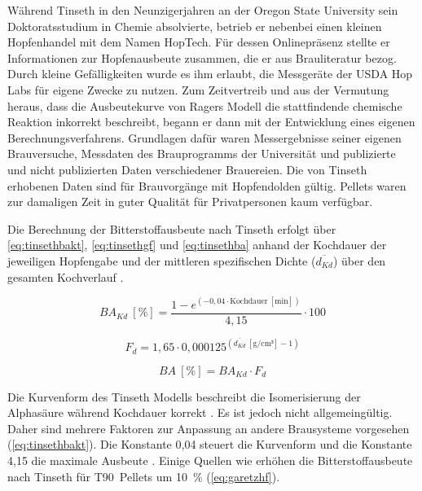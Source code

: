 \documentclass[a4paper,parskip=half]{scrartcl}
\newcommand{\BA}{\mathit{BA}}
\newcommand{\BAKt}{{\mathit{BA}}_{\mathit{Kd}}}
\newcommand{\umin}{\:[\textrm{min}]}
\newcommand{\uden}{\:[\text{g/cm³}]}
\newcommand{\uper}{\:[\text{\%}]}
\newcommand{\FKd}{F_{\mathit{d}}}
\newcommand{\dKt}{\overline{d_{\mathit{Kd}}}}
\begin{document}
Während Tinseth in den Neunzigerjahren an der Oregon State University sein Doktoratsstudium in Chemie absolvierte, betrieb er nebenbei einen kleinen Hopfenhandel mit dem Namen HopTech. Für dessen Onlinepräsenz stellte er Informationen zur Hopfenausbeute zusammen, die er aus Brauliteratur bezog. Durch kleine Gefälligkeiten wurde es ihm erlaubt, die Messgeräte der USDA Hop Labs für eigene Zwecke zu nutzen. Zum Zeitvertreib und aus der Vermutung heraus, dass die Ausbeutekurve von Ragers Modell die stattfindende chemische Reaktion inkorrekt beschreibt, begann er dann mit der Entwicklung eines eigenen Berechnungsverfahrens. Grundlagen dafür waren Messergebnisse seiner eigenen Brauversuche, Messdaten des Brauprogramms der Universität und publizierte und nicht publizierten Daten verschiedener Brauereien. Die von Tinseth erhobenen Daten sind für Brauvorgänge mit Hopfendolden gültig. Pellets waren zur damaligen Zeit in guter Qualität für Privatpersonen kaum verfügbar. \parencites[0:55:45-1:08:00]{Beechum2017a}[2:10-6:30]{Smith2011}

Die Berechnung der Bitterstoffausbeute nach Tinseth erfolgt über \autoref{eq:tinsethbakt}, \autoref{eq:tinsethgf} und \autoref{eq:tinsethba} anhand der Kochdauer der jeweiligen Hopfengabe und der mittleren spezifischen Dichte ($\dKt$) über den gesamten Kochverlauf \parencite{Tinseth1997}.

\begin{equation}
\BAKt \uper = \frac{1 - e^{\left(-0,04 \cdot \text{Kochdauer} \umin \right)}}{4,15} \cdot 100
\label{eq:tinsethbakt}
\end{equation}

\begin{equation}
\FKd = 1,65 \cdot 0,000125^{\left(\overline{d_{\mathit{Kd}}} \uden - 1 \right)}
\label{eq:tinsethgf}
\end{equation}

\begin{equation}
\BA \uper = \BAKt \cdot \FKd
\label{eq:tinsethba}
\end{equation}

Die Kurvenform des Tinseth Modells beschreibt die Isomerisierung der Alphasäure während Kochdauer korrekt \parencite[43]{Malowicki2005}. Es ist jedoch nicht allgemeingültig. Daher sind mehrere Faktoren zur Anpassung an andere Brausysteme vorgesehen (\autoref{eq:tinsethbakt}). Die Konstante 0,04 steuert die Kurvenform und die Konstante 4,15 die maximale Ausbeute \parencite{Tinseth1997}. Einige Quellen wie \textcite{Novotny2018} erhöhen die Bitterstoffausbeute nach Tinseth für T90~Pellets um 10~\% (\autoref{eq:garetzhf}).
\end{document}
